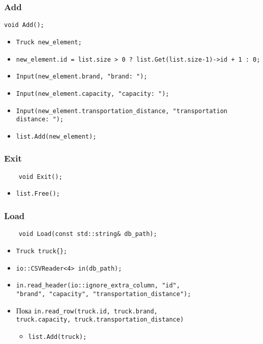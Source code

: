 \subsubsection*{Add}

\begin{lstlisting}
void Add();
\end{lstlisting}

\begin{itemize}
	\item \verb|Truck new_element;|
	\item \verb|new_element.id = list.size > 0 ? list.Get(list.size-1)->id + 1 : 0;|
	\item \verb|Input(new_element.brand, "brand: ");|
	\item \verb|Input(new_element.capacity, "capacity: ");|
	\item \verb|Input(new_element.transportation_distance, "transportation distance: ");|
	\item \verb|list.Add(new_element);|
\end{itemize}


\subsubsection*{Exit}

\begin{lstlisting}
	void Exit();
\end{lstlisting}

\begin{itemize}
	\item \verb|list.Free();|
\end{itemize}


\subsubsection*{Load}

\begin{lstlisting}
	void Load(const std::string& db_path);
\end{lstlisting}

\begin{itemize}
	\item \verb|Truck truck{};|
	\item \verb|io::CSVReader<4> in(db_path);|
	\item \verb|in.read_header(io::ignore_extra_column, "id",|\\
	\verb|"brand", "capacity", "transportation_distance");|
	\item Пока \verb|in.read_row(truck.id, truck.brand,|\\ 
	\verb|truck.capacity, truck.transportation_distance)|
	\begin{itemize}
		\item \verb|list.Add(truck);|
	\end{itemize}
\end{itemize}


